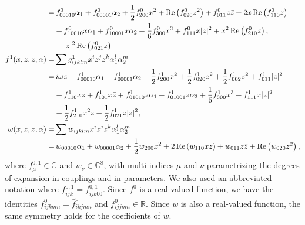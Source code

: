\begin{subappendices}
\begin{equation}
\begin{aligned}
= &\,
f^0_{00010} \alpha_1 + f^0_{00001} \alpha_2 + \frac12 f^0_{200} x^2 + \Re \left(f^0_{020} z^2 \right) + f^0_{011} z\bar z + 2 x \Re \left( f^0_{110} z \right)   \\
   &+  f^0_{10010} x \alpha_1 + f^0_{10001} x \alpha_2 + \frac16 f^0_{300} x^3 + f^0_{111} x |z|^2 +  x^2 \Re \left( f^0_{210} z \right),  \\
   &+ |z|^2 \Re \left( f^0_{021} z \right)     \vspace{2mm}  \\
f^1(x,z,\bar z, \alpha) =& \sum g^1_{ijklm} x^i z^j \bar{z}^k   \alpha_1^l \alpha_2^m   \\
=&\, i \omega z+ f^1_{00010} \alpha_1 + f^1_{00001} \alpha_2 + \frac12 f^1_{200} x^2 + \frac12 f^1_{020} z^2 + \frac12 f^1_{002} \bar z^2 + f^1_{011} |z|^2   \\
    & + f^1_{110} x z + f^1_{101} x \bar z + f^{1}_{01010} z \alpha_1 + f^{1}_{01001} z \alpha_2 + \frac16 f^1_{300} x^3 +
        f^1_{111} x |z|^2  \\
    &+ \frac12 f^1_{210} x^2 z + \frac12 f^1_{021}  z |z|^2,
    \\
w(x,z,\bar z, \alpha) =& \sum w_{ijklm} x^i z^j \bar{z}^k  \alpha_1^l \alpha_2^m   \label{eq:w} \\
= &\, w_{00010} \alpha_1 + w_{00001} \alpha_2 + \frac12 w_{200} x^2 + 2 \Re\left(w_{110} xz \right) +  w_{011} z\bar z + \Re\left( w_{020} z^2 \right), 
\end{aligned}
\end{equation}
where $f^{0,1}_\mu \in \mathbb C$ and $w_\nu \in \mathbb C^8$,
with multi-indices $\mu$ and $\nu$ parametrizing the degrees of expansion in couplings and in parameters. We also used an abbreviated notation where $f^{0,1}_{ijk} = f^{0,1}_{ijk00}$. Since $f^0$ is a real-valued
function, we have the identities $f^0_{ijkmn} = \bar f^0_{ikjmn}$ and 
$f^0_{ijjmn} \in \mathbb R$. Since $w$ is also a real-valued function, the
same symmetry holds for the coefficients of $w$.  



\end{subappendices}
